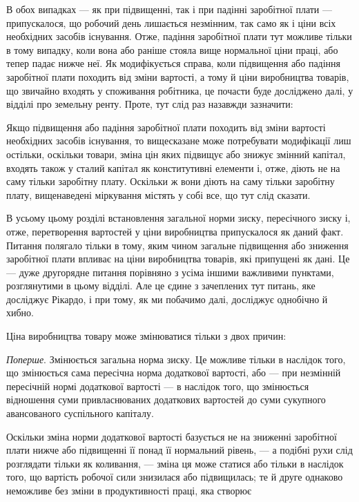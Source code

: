 \parcont{}  %
В обох випадках — як при підвищенні, так і при падінні заробітної плати — припускалося, що робочий
день лишається незмінним, так само як і ціни всіх необхідних засобів існування. Отже, падіння
заробітної плати тут можливе тільки в тому випадку, коли вона або раніше стояла вище нормальної ціни
праці, або тепер падає нижче неї. Як модифікується справа, коли підвищення або падіння заробітної
плати походить від зміни вартості, а тому й ціни виробництва товарів, що звичайно входять у
споживання робітника, це почасти буде досліджено далі, у відділі про земельну ренту. Проте, тут слід
раз назавжди зазначити:

Якщо підвищення або падіння заробітної плати походить від зміни вартості необхідних засобів
існування, то вищесказане може потребувати модифікації лиш остільки, оскільки товари, зміна цін яких
підвищує або знижує змінний капітал, входять також у сталий капітал як конститутивні елементи і,
отже, діють не на саму тільки заробітну плату. Оскільки ж вони діють на саму тільки заробітну плату,
вищенаведені міркування містять у собі все, що тут слід сказати.

В усьому цьому розділі встановлення загальної норми зиску, пересічного зиску і, отже, перетворення
вартостей у ціни виробництва припускалося як даний факт. Питання полягало тільки в тому, яким чином
загальне підвищення або зниження заробітної плати впливає на ціни виробництва товарів, які припущені
як дані. Це — дуже другорядне питання порівняно з усіма іншими важливими пунктами, розглянутими в
цьому відділі. Але
це єдине з зачеплених тут питань, яке досліджує Рікардо, і при тому, як ми побачимо далі, досліджує
однобічно й хибно.


Ціна виробництва товару може змінюватися тільки з двох причин:

\emph{Поперше}. Змінюється загальна норма зиску. Це можливе тільки в наслідок того, що змінюється сама
пересічна норма додаткової вартості, або — при незмінній пересічній нормі додаткової вартості — в
наслідок того, що змінюється відношення суми привласнюваних додаткових вартостей до суми сукупного
авансованого суспільного капіталу.

Оскільки зміна норми додаткової вартості базується не на зниженні заробітної плати нижче або
підвищенні її понад її нормальний рівень, — а подібні рухи слід розглядати тільки як коливання, —
зміна ця може статися або тільки в наслідок того, що вартість робочої сили знизилася або
підвищилась; те й друге однаково неможливе без зміни в продуктивності праці, яка створює
\parbreak{}  %
